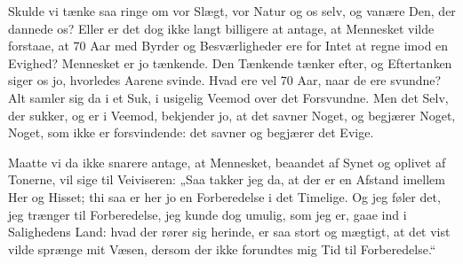 \documentclass[12pt,a4paper]{book}
\newcommand{\apage}[1]{\marginnote{\footnotesize\textit{[#1]}}}
\begin{document}
Skulde vi tænke saa ringe om vor Slægt, vor Natur og os selv, og vanære Den, der dannede os? Eller er det dog ikke langt billigere at antage, at Mennesket vilde forstaae, at 70 Aar med Byrder og Besværligheder ere for Intet at regne imod en Evighed? Mennesket er jo tænkende. Den Tænkende tænker efter, og Eftertanken siger os jo, hvorledes Aarene svinde. Hvad ere vel 70 Aar, naar de ere svundne? Alt samler sig da i et Suk, i usigelig Veemod over det Forsvundne. Men det Selv, der sukker, og er i Veemod, bekjender jo, at det savner Noget, og begjærer Noget, Noget, som ikke er forsvindende: det savner og begjærer det Evige.

Maatte vi da ikke snarere antage, at Mennesket, beaandet af Synet og oplivet af Tonerne, vil sige til Veiviseren: „Saa takker jeg da, at der er en Afstand imellem Her og Hisset; thi saa er her jo en Forberedelse i det Timelige. Og jeg føler det, jeg trænger til Forberedelse, jeg kunde dog umulig, som jeg er, gaae ind i Salighedens Land: hvad \apage{7} der
rører sig herinde, er saa stort og mægtigt, at det vist vilde sprænge mit Væsen, dersom der ikke forundtes mig Tid til Forberedelse.“
\end{document}
